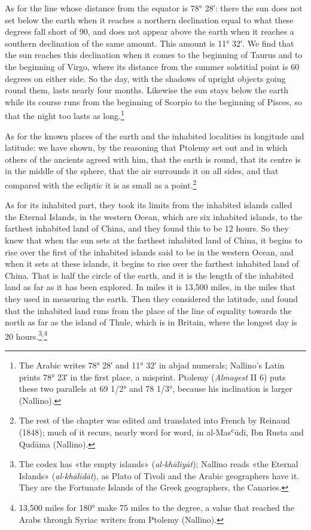 \documentclass[11pt]{article}
\newcommand{\ArPage}[1]{\marginpar{\footnotesize\color{gray}Ar.\,p.\,#1}}
\begin{document}
\par \ArPage{25}As for the line whose distance from the equator is 78° 28′: there the sun does not set below the earth when it reaches a northern declination equal to what these degrees fall short of 90, and does not appear above the earth when it reaches a southern declination of the same amount. This amount is 11° 32′. We find that the sun reaches this declination when it comes to the beginning of Taurus and to the beginning of Virgo, where its distance from the summer solstitial point is 60 degrees on either side. So the day, with the shadows of upright objects going round them, lasts nearly four months. Likewise the sun stays below the earth while its course runs from the beginning of Scorpio to the beginning of Pisces, so that the night too lasts as long.\footnote{The Arabic writes 78° 28′ and 11° 32′ in abjad numerals; Nallino's Latin prints 78° 23′ in the first place, a misprint. Ptolemy (\emph{Almagest} II 6) puts these two parallels at 69 1/2° and 78 1/3°, because his inclination is larger (Nallino).}\par
\par As for the known places of the earth and the inhabited localities in longitude and latitude: we have shown, by the reasoning that Ptolemy set out and in which others of the ancients agreed with him, that the earth is round, that its centre is in the middle of the sphere, that the air surrounds it on all sides, and that compared with the ecliptic it is as small as a point.\footnote{The rest of the chapter was edited and translated into French by Reinaud (1848); much of it recurs, nearly word for word, in al-Masʿūdī, Ibn Rusta and Qudāma (Nallino).}\par
\par As for its inhabited part, they took its limits from the inhabited islands called the Eternal Islands, in the western Ocean, which are six inhabited islands, to the farthest inhabited land of China, and they found this to be 12 hours. So they knew that when the sun sets at the farthest inhabited land of China, it begins to rise over the first of the inhabited islands said to be in the western Ocean, and when it sets at these islands, it begins to rise over the farthest inhabited land of China. That is half the circle of the earth, and it is the length of the inhabited land as far as it has been explored. In miles it is 13,500 miles, in the miles that they used in measuring the earth. Then they considered the latitude, and found that the inhabited land runs from the place of the line of equality towards the north as far as the island of Thule, which is in Britain, where the longest day is 20 hours.\footnote{The codex has «the empty islands» (\emph{al-khāliyāt}); Nallino reads «the Eternal Islands» (\emph{al-khālidāt}), as Plato of Tivoli and the Arabic geographers have it. They are the Fortunate Islands of the Greek geographers, the Canaries.}\textsuperscript{,}\footnote{13,500 miles for 180° make 75 miles to the degree, a value that reached the Arabs through Syriac writers from Ptolemy (Nallino).}\par
\end{document}
